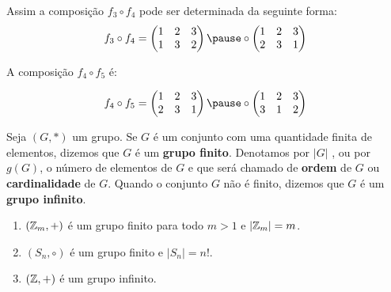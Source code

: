 \documentclass{beamer}
\begin{document}
    \begin{frame}
        Assim a composição $f_3 \circ f_4$ pode ser determinada da seguinte forma:
        \[
        f_3\circ f_4 = \begin{pmatrix}
            1 & 2 & 3\\
            1 & 3 & 2
        \end{pmatrix} \pause \circ \begin{pmatrix}
            1 & 2 & 3\\
            2 & 3 & 1
        \end{pmatrix}
        \]
    \end{frame}

    \begin{frame}
        A composição $f_4 \circ f_5$ é:

        \[
        f_4\circ f_5 = \begin{pmatrix}
            1 & 2 & 3\\
            2 & 3 & 1
        \end{pmatrix} \pause \circ \begin{pmatrix}
            1 & 2 & 3\\
            3 & 1 & 2
        \end{pmatrix}
        \]
    \end{frame}

    \begin{frame}
        \begin{definicao}
            Seja $(G,*)$ um grupo. \pause Se $G$ é um conjunto com uma quantidade finita de elementos, \pause dizemos que $G$ é um \textbf{grupo finito}. \pause Denotamos por $|G|$ \pause, ou por $g(G)$\pause, o número de elementos de $G$ \pause e que será chamado de \textbf{ordem} de $G$ \pause ou \textbf{cardinalidade} de $G$. \pause Quando o conjunto $G$ não é finito, \pause dizemos que $G$ é um \textbf{grupo infinito}.\pause
        \end{definicao}

        \begin{exemplos}
            \begin{enumerate}[label={\roman*})]
                \item $(\mathbb{Z}_m, +)$ é um grupo finito para todo $m>1$ \pause e $|\mathbb{Z}_m| = m$.\pause
                \item $(S_n, \circ)$ é um grupo finito \pause e $|S_n| = n!$.\pause
                \item $(\mathbb{Z}, +)$ é um grupo infinito.
            \end{enumerate}
        \end{exemplos}
    \end{frame}
\end{document}
